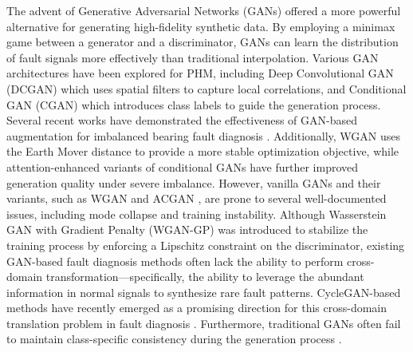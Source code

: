 The advent of Generative Adversarial Networks (GANs) \cite{1} offered a more powerful alternative for generating high-fidelity synthetic data. By employing a minimax game between a generator and a discriminator, GANs can learn the distribution of fault signals more effectively than traditional interpolation. Various GAN architectures have been explored for PHM, including Deep Convolutional GAN (DCGAN) \cite{14} which uses spatial filters to capture local correlations, and Conditional GAN (CGAN) which introduces class labels to guide the generation process. Several recent works have demonstrated the effectiveness of GAN-based augmentation for imbalanced bearing fault diagnosis \cite{33, 43}. Additionally, WGAN uses the Earth Mover distance to provide a more stable optimization objective, while attention-enhanced variants of conditional GANs \cite{34} have further improved generation quality under severe imbalance. However, vanilla GANs and their variants, such as WGAN \cite{2} and ACGAN \cite{5}, are prone to several well-documented issues, including mode collapse and training instability. Although Wasserstein GAN with Gradient Penalty (WGAN-GP) \cite{3} was introduced to stabilize the training process by enforcing a Lipschitz constraint on the discriminator, existing GAN-based fault diagnosis methods \cite{36, 37} often lack the ability to perform cross-domain transformation—specifically, the ability to leverage the abundant information in normal signals to synthesize rare fault patterns. CycleGAN-based methods have recently emerged as a promising direction for this cross-domain translation problem in fault diagnosis \cite{39}. Furthermore, traditional GANs often fail to maintain class-specific consistency during the generation process \cite{4, 36}.

